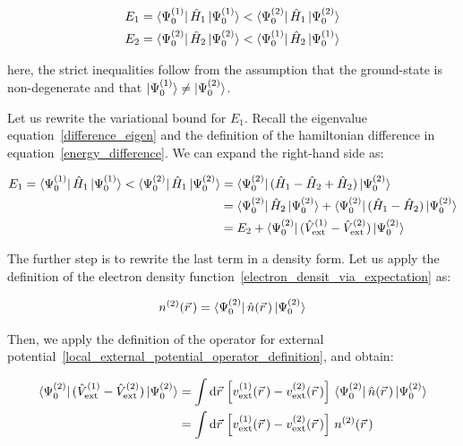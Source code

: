 \begin{equation}
\begin{aligned}
    E_1&=\bra{\Psi_0^{(1)}}\hat{H}_1\ket{\Psi_0^{(1)}}<\bra{\Psi_0^{(2)}}\hat{H}_1\ket{\Psi_0^{(2)}}\\
    E_2&=\bra{\Psi_0^{(2)}}\hat{H}_2\ket{\Psi_0^{(2)}}<\bra{\Psi_0^{(1)}}\hat{H}_2\ket{\Psi_0^{(1)}}
\end{aligned}
\label{Rayleigh-Ritz_principle_application}
\end{equation}

here, the strict inequalities follow from the assumption that the ground-state is non-degenerate and that $\ket{\Psi_0^{(1)}}\neq\ket{\Psi_0^{(2)}}$.

Let us rewrite the variational bound for $E_1$.
Recall the eigenvalue equation~\eqref{difference_eigen} and the definition of the hamiltonian difference in equation~\eqref{energy_difference}.
We can  expand the right-hand side as:

\begin{equation}
\begin{aligned}
    E_1=\bra{\Psi_0^{(1)}}\hat{H}_1\ket{\Psi_0^{(1)}}<\bra{\Psi_0^{(2)}}\hat{H}_1\ket{\Psi_0^{(2)}}
    &=\bra{\Psi_0^{(2)}}(\hat{H}_1-\hat{H}_2+\hat{H}_2)\ket{\Psi_0^{(2)}} \\
    &=\bra{\Psi_0^{(2)}}\hat{H}_2\ket{\Psi_0^{(2)}}
      +\bra{\Psi_0^{(2)}}(\hat{H}_1-\hat{H}_2)\ket{\Psi_0^{(2)}} \\
    &=E_2+\bra{\Psi_0^{(2)}}(\hat{V}_\mathrm{ext}^{(1)}-\hat{V}_\mathrm{ext}^{(2)})\ket{\Psi_0^{(2)}} \\
\end{aligned}
\label{H1_expectation_expansion}
\end{equation}

The further step is to rewrite the last term in a density form.
Let us apply the definition of the electron density function~\eqref{electron_densit_via_expectation} as:

\begin{equation}
    n^{(2)}(\vec{r}\,) = \bra{\Psi_0^{(2)}}\hat{n}(\vec{r}\,)\ket{\Psi_0^{(2)}}
\label{density_expectation_definition}
\end{equation}

Then, we apply the definition of the operator for external potential~\eqref{local_external_potential_operator_definition}, and obtain:

\begin{equation}
\begin{aligned}
    \bra{\Psi_0^{(2)}}(\hat{V}_\mathrm{ext}^{(1)}-\hat{V}_\mathrm{ext}^{(2)})\ket{\Psi_0^{(2)}}
    &=\int \mathrm{d}\vec{r}\,\left[v_\mathrm{ext}^{(1)}(\vec{r}\,)-v_\mathrm{ext}^{(2)}(\vec{r}\,)\right]\,\bra{\Psi_0^{(2)}}\hat{n}(\vec{r}\,)\ket{\Psi_0^{(2)}} \\
    &=\int \mathrm{d}\vec{r}\,\left[v_\mathrm{ext}^{(1)}(\vec{r}\,)-v_\mathrm{ext}^{(2)}(\vec{r}\,)\right]\,n^{(2)}(\vec{r}\,)
\end{aligned}
\label{density_form_vext_difference}
\end{equation}

